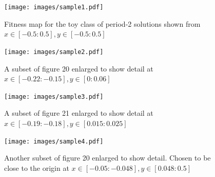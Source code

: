 \documentclass[12pt]{article}
\begin{document}
\begin{figure}[htb]
\begin{center}
\texttt{[image: images/sample1.pdf]}
\caption{Fitness map for the toy class of period-2 solutions shown from $x\in[-0.5:0.5], y\in[-0.5:0.5]$}
\end{center}
\end{figure}
\begin{figure}[htb]
\begin{center}
\texttt{[image: images/sample2.pdf]}
\caption{A subset of figure 20 enlarged to show detail at $x\in[-0.22:-0.15], y\in[0:0.06]$}
\end{center}
\end{figure}
\begin{figure}[htb]
\begin{center}
\texttt{[image: images/sample3.pdf]}
\caption{A subset of figure 21 enlarged to show detail at $x\in[-0.19:-0.18], y\in[0.015:0.025]$}
\end{center}
\end{figure}
\begin{figure}[htb]
\begin{center}
\texttt{[image: images/sample4.pdf]}
\caption{Another subset of figure 20 enlarged to show detail.  Chosen to be close to the origin at $x\in[-0.05:-0.048], y\in[0.048:0.5]$}
\end{center}
\end{figure}
\end{document}
